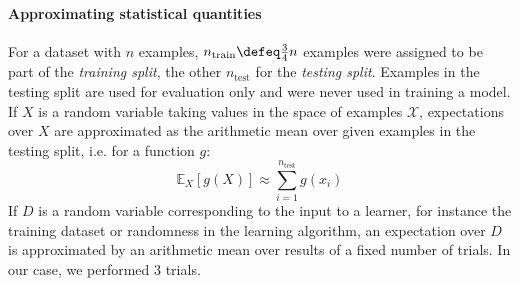 \documentclass[
	twoside=false, %
]{kaobook}
\begin{document}
\paragraph{Approximating statistical quantities} 
For a dataset with $n$ examples, $n_{\text{train}} \defeq \frac{3}{4}n$ examples were assigned to be part of the \textit{training split}, the other $n_{\text{test}}$ for the \textit{testing split}. Examples in the testing split are used for evaluation only and were never used in training a model.
If $X$ is a random variable taking values in the space of examples $\mathcal{X}$, expectations over $X$ are approximated as the arithmetic mean over given examples in the testing split, i.e. for a function $g$:
$$
\mathbb{E}_X \left[ g(X) \right]  \approx \sum_{i=1}^{n_\text{test}} g(x_i)
$$
If $D$ is a random variable corresponding to the input to a learner, for instance the training dataset or randomness in the learning algorithm, an expectation over $D$ is approximated by an arithmetic mean over results of a fixed number of trials. In our case, we performed $3$ trials. %



\end{document}
